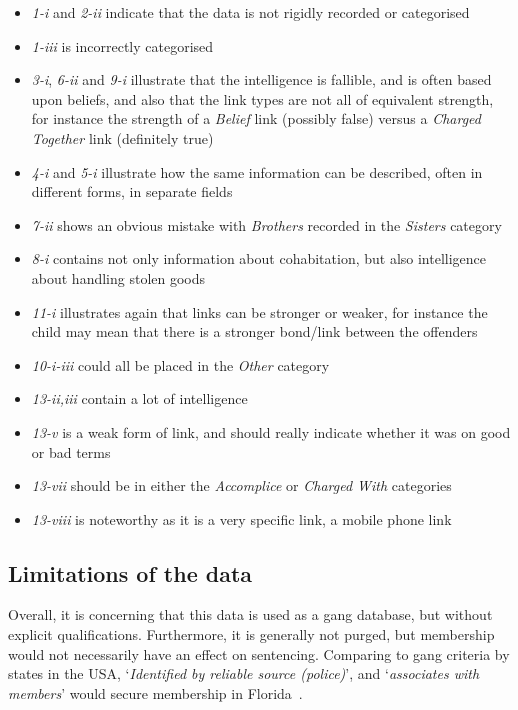 \documentclass[twocolumn]{svjour3}          %
\theoremstyle{definition}
\begin{document}
\begin{itemize}
\item	\emph{1-i} and \emph{2-ii} indicate that the data is not rigidly recorded or categorised 
\item	\emph{1-iii} is incorrectly categorised
\item	\emph{3-i}, \emph{6-ii} and \emph{9-i} illustrate that the
  intelligence is fallible, and is often based upon beliefs, and also
  that the link types are not all of equivalent strength, for instance
  the strength of a \emph{Belief} link (possibly false) versus a \emph{Charged
  Together} link (definitely true)
\item	\emph{4-i} and \emph{5-i} illustrate how the same information can be described, often in different forms, in separate fields
\item	\emph{7-ii} shows an obvious mistake with \emph{Brothers} recorded in the \emph{Sisters} category
\item	\emph{8-i} contains not only information about cohabitation, but also intelligence about handling stolen goods
\item	\emph{11-i} illustrates again that links can be stronger or weaker, for instance the child may mean that there is a stronger bond/link between the offenders
\item	\emph{10-i-iii} could all be placed in the \emph{Other} category
\item	\emph{13-ii,iii} contain a lot of intelligence
\item	\emph{13-v} is a weak form of link, and should really indicate whether it was on good or bad terms
\item	\emph{13-vii} should be in either the \emph{Accomplice} or
  \emph{Charged With} categories
\item	\emph{13-viii} is noteworthy as it is a very specific link, a mobile phone link
\end{itemize}


\subsection{Limitations of the data}\label{sec:limitations}

Overall, it is concerning that this
data is used as a gang database, but without explicit
qualifications. Furthermore, it is generally not purged, but
membership would not necessarily have an effect on sentencing.
Comparing to gang criteria by states in the USA, `{\emph{Identified by
reliable source (police)}}', and `{\emph{associates with members}}'
would secure membership in Florida~\citep{barrows-huff:2009}.
\end{document}
